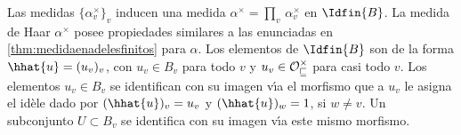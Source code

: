 Las medidas $\{\alpha_{v}^{\times}\}_{v}$
inducen una medida $\alpha^{\times}=\prod_{v}\,\alpha_{v}^{\times}$ en
$\Idfin{B}$. La medida de Haar $\alpha^{\times}$ posee propiedades similares
a las enunciadas en \ref{thm:medidaenadelesfinitos} para $\alpha$.
Los elementos de $\Idfin{B}$ son de la forma $\hhat{u}=(u_{v})_{v}$, con
$u_{v}\in B_{v}$ para todo $v$ y $u_{v}\in\cal{O}_{v}^{\times}$ para casi todo
$v$. Los elementos $u_{v}\in B_{v}$ se identifican con su imagen v\'{\i}a el
morfismo que a $u_{v}$ le asigna el id\`{e}le dado por $(\hhat{u})_{v}=u_{v}$
y $(\hhat{u})_{w}=1$, si $w\not= v$. Un subconjunto $U\subset B_{v}$ se
identifica con su imagen v\'{\i}a este mismo morfismo.


